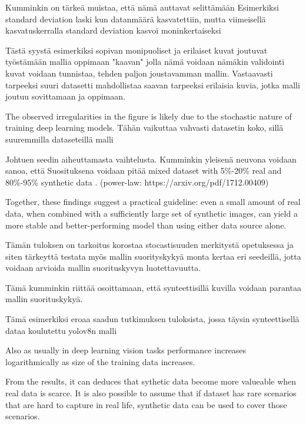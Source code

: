 Kumminkin on tärkeä muistaa, että nämä auttavat selittämään  Esimerkiksi \cite{ebadi2022peoplesanspeoplesyntheticdatagenerator} standard deviation laski kun datanmäärä kasvatettiin, mutta viimeisellä kasvatuskerralla standard deviation kasvoi moninkertaiseksi

Tästä syystä esimerkiksi sopivan monipuoliset ja erilaiset kuvat joutuvat työstämään mallia oppimaan "kaavan" jolla nämä voidaan nämäkin validointi kuvat voidaan tunnistaa, tehden paljon joustavamman mallin. Vastaavasti tarpeeksi suuri datasetti mahdollistaa saavan tarpeeksi erilaisia kuvia, jotka malli joutuu sovittamaan ja oppimaan.

The observed irregularities in the figure is likely due to the stochastic nature of training deep learning models. Tähän vaikuttaa vahvasti datasetin koko, sillä suuremmilla dataseteillä malli 

Johtuen seedin aiheuttamasta vaihtelusta. Kumminkin yleisenä neuvona voidaan sanoa, että 
Suosituksena voidaan pitää  mixed dataset with 5\%-20\% real and 80\%-95\% synthetic data \cite{burdorf2022reducingrealworlddata}. 
(power-law: https://arxiv.org/pdf/1712.00409)

Together, these findings suggest a practical guideline: even a small amount of real data, when combined with a sufficiently large set of synthetic images, can yield a more stable and better-performing model than using either data source alone.

 Tämän tuloksen on tarkoitus korostaa stocastisuuden merkitystä opetuksessa ja siten tärkeyttä testata myös mallin suorityskykyä monta kertaa eri seedeillä, jotta voidaan arvioida mallin suorituskyvyn luotettavuutta.

 Tämä kumminkin riittää osoittamaan, että synteettisillä kuvilla voidaan parantaa mallin suorituskykyä.

 Tämä esimerkiksi eroaa \cite{xin2024dartautomatedendtoendobject} saadun tutkimuksen tuloksista, jossa täysin synteettisellä dataa koulutettu yolov8n malli

 Also as usually in deep learning vision tasks performance increases logarithmically as size of the training data increases.

From the results, it can deduces that sythetic data become more valueable when real data is scarce. It is also possible to assume that if dataset has rare scenarios that are hard to capture in real life, synthetic data can be used to cover those scenarios.

